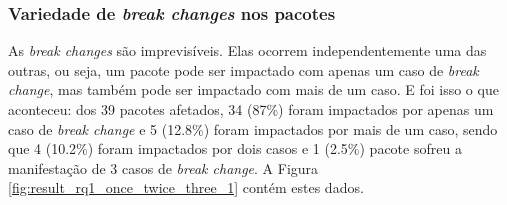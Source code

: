 \subsubsection{Variedade de \textit{break changes} nos pacotes}
As \textit{break changes} são imprevisíveis. Elas ocorrem independentemente uma das outras, ou seja, um pacote pode ser impactado com apenas um caso de \textit{break change}, mas também pode ser impactado com mais de um caso. E foi isso o que aconteceu: dos 39 pacotes afetados, 34 (87\%) foram impactados por apenas um caso de \textit{break change} e 5 (12.8\%) foram impactados por mais de um caso, sendo que 4 (10.2\%) foram impactados por dois casos e 1 (2.5\%) pacote sofreu a manifestação de 3 casos de \textit{break change}. A Figura \ref{fig:result_rq1_once_twice_three_1} contém estes dados.

